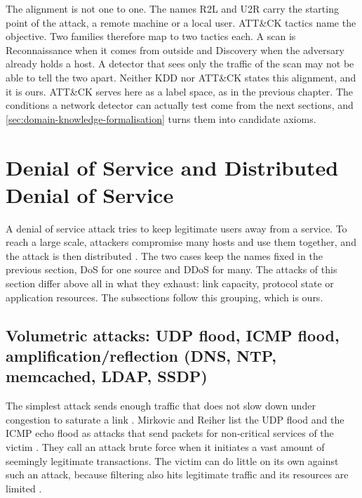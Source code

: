 The alignment is not one to one. The names R2L and U2R carry the starting
point of the attack, a remote machine or a local user. ATT\&CK tactics name
the objective. Two families therefore map to two tactics each. A scan is
Reconnaissance when it comes from outside and Discovery when the adversary
already holds a host. A detector that sees only the traffic of the scan may
not be able to tell the two apart. Neither KDD nor ATT\&CK states this
alignment, and it is ours. ATT\&CK serves here as a label space, as in the
previous chapter. The conditions a network detector can actually test come
from the next sections, and \cref{sec:domain-knowledge-formalisation} turns
them into candidate axioms.

\section{Denial of Service and Distributed Denial of Service}
\label{sec:dos-ddos}

A denial of service attack tries to keep legitimate users away from a
service. To reach a large scale, attackers compromise many hosts and use them
together, and the attack is then distributed \citep{handley2006rfc4732}. The
two cases keep the names fixed in the previous section, DoS for one source
and DDoS for many. The attacks of this section differ above all in what they
exhaust: link capacity, protocol state or application resources. The
subsections follow this grouping, which is ours.

\subsection{Volumetric attacks: UDP flood, ICMP flood, amplification/\allowbreak reflection (DNS, NTP, memcached, LDAP, SSDP)}
\label{sec:volumetric-attacks}

The simplest attack sends enough traffic that does not slow down under
congestion to saturate a link \citep{handley2006rfc4732}. Mirkovic and Reiher
list the UDP flood and the ICMP echo flood as attacks that send packets for
non-critical services of the victim \citep{mirkovic2004taxonomy}. They call an
attack brute force when it initiates a vast amount of seemingly legitimate
transactions. The victim can do little on its own against such an attack,
because filtering also hits legitimate traffic and its resources are limited
\citep{mirkovic2004taxonomy}.

